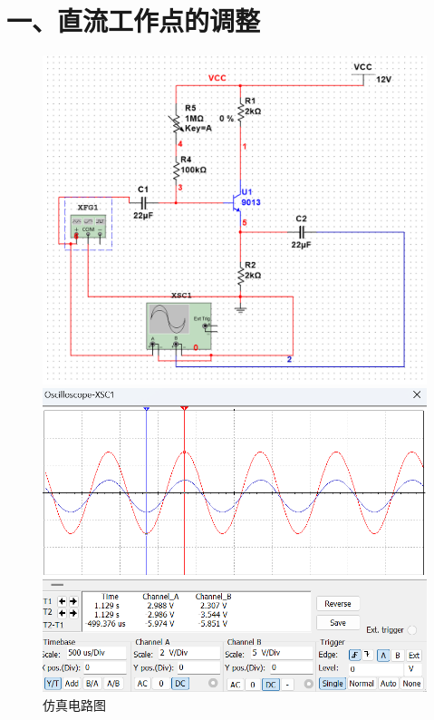 \documentclass[a4paper,10pt,notitlepage]{article}
\begin{document}
	\section*{一、直流工作点的调整}
	\begin{figure}[h]
		\raggedright
		\begin{minipage}{0.3\textwidth}
			\centering
			\includegraphics[width=\textwidth]{1.png}
			\caption*{仿真电路图}
		\end{minipage}
		\qquad
		\begin{minipage}{0.28\textwidth}
			\centering
			\includegraphics[width=\textwidth]{2.png}

\end{minipage}
\end{figure}
\end{document}

